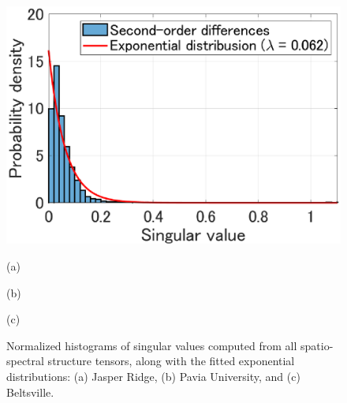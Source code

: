 \begin{figure}[t]
\begin{center}
\begin{minipage}{0.325\hsize}
			\centerline{\includegraphics[width=\hsize]{./fig_supplement/Dist_Anal/SV_Dist_Beltsville.eps}}
		\end{minipage}
		
		\vspace{1mm}
		
		\begin{minipage}{0.325\hsize}
			\centerline{\small{(a)}}
		\end{minipage}
		\begin{minipage}{0.325\hsize}
			\centerline{\small{(b)}}
		\end{minipage}
		\begin{minipage}{0.325\hsize}
			\centerline{\small{(c)}}
		\end{minipage}
		
	\end{center}
	
	\caption{Normalized histograms of singular values computed from all spatio-spectral structure tensors, along with the fitted exponential distributions: (a) Jasper Ridge, (b) Pavia University, and (c) Beltsville.}
	
	\label{fig:data_dist}
\end{figure}
